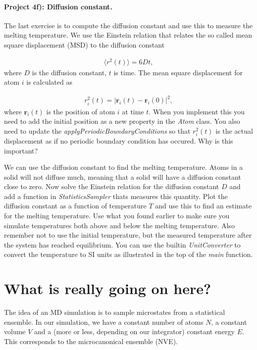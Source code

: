 \documentclass[%
oneside,                 %
final,                   %
10pt]{article}
\begin{document}
\paragraph{Project 4f): Diffusion constant.}
The last exercise is to compute the diffusion constant and use this to measure the melting temperature. We use the Einstein relation that relates the so called mean square displacement (MSD) to the diffusion constant

\begin{align}
	\langle r^2(t) \rangle = 6Dt,
\end{align}
where $D$ is the diffusion constant, $t$ is time. The mean square displacement for atom $i$ is calculated as

\begin{align}
	r_i^2(t) = |\mathbf{r}_i(t) - \mathbf{r}_i(0)|^2,
\end{align}
where $\mathbf{r}_i(t)$ is the position of atom $i$ at time $t$. When you implement this you need to add the initial position as a new property in the \emph{Atom} class. You also need to update the \emph{applyPeriodicBoundaryConditions} so that $r_i^2(t)$ is the actual displacement as if no periodic boundary condition has occured. Why is this important?

We can use the diffusion constant to find the melting temperature. Atoms in a solid will not diffuse much, meaning that a solid will have a diffusion constant close to zero. Now solve the Einstein relation for the diffusion constant $D$ and add a function in \emph{StatisticsSampler} thats measures this quantity. Plot the diffusion constant as a function of temperature $T$ and use this to find an estimate for the melting temperature. Use what you found earlier  to make sure you simulate temperatures both above and below the melting temperature. Also remember not to use the initial temperature, but the measured temperature after the system has reached equilibrium. You can use the builtin \emph{UnitConverter} to convert the temperature to SI units as illustrated in the top of the \emph{main} function. 


\section*{What is really going on here?}
The idea of an MD simulation is to sample microstates from a statistical ensemble. In our simulation, we have a constant number of atoms $N$, a constant volume $V$ and a (more or less, depending on our integrator) constant energy $E$. This corresponds to the microcanonical ensemble (NVE). 
\end{document}
